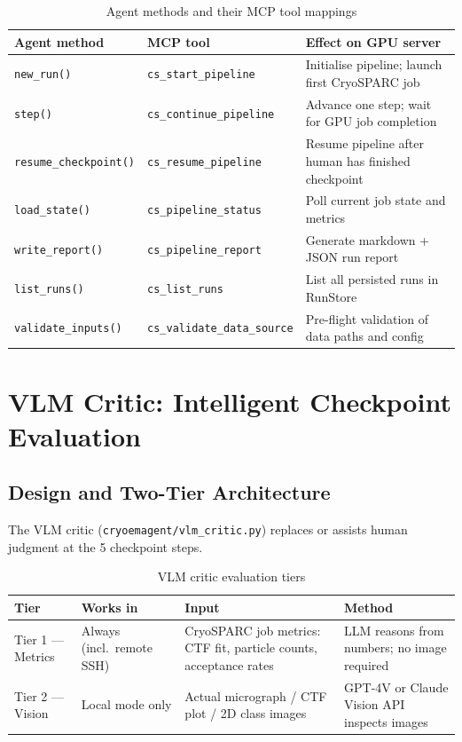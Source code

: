 \documentclass[12pt, a4paper]{article}
\begin{document}
\begin{table}[H]
\centering
\caption{Agent methods and their MCP tool mappings}
\label{tab:actions}
\renewcommand{\arraystretch}{1.3}
\begin{tabular}{l l p{6.2cm}}
\toprule
\textbf{Agent method} & \textbf{MCP tool} & \textbf{Effect on GPU server} \\
\midrule
\texttt{new\_run()}           & \texttt{cs\_start\_pipeline}
  & Initialise pipeline; launch first CryoSPARC job \\
\texttt{step()}               & \texttt{cs\_continue\_pipeline}
  & Advance one step; wait for GPU job completion \\
\texttt{resume\_checkpoint()} & \texttt{cs\_resume\_pipeline}
  & Resume pipeline after human has finished checkpoint \\
\texttt{load\_state()}        & \texttt{cs\_pipeline\_status}
  & Poll current job state and metrics \\
\texttt{write\_report()}      & \texttt{cs\_pipeline\_report}
  & Generate markdown + JSON run report \\
\texttt{list\_runs()}         & \texttt{cs\_list\_runs}
  & List all persisted runs in RunStore \\
\texttt{validate\_inputs()}   & \texttt{cs\_validate\_data\_source}
  & Pre-flight validation of data paths and config \\
\bottomrule
\end{tabular}
\end{table}

\section{VLM Critic: Intelligent Checkpoint Evaluation}
\label{sec:vlm}

\subsection{Design and Two-Tier Architecture}

The VLM critic (\texttt{cryoemagent/vlm\_critic.py}) replaces or assists
human judgment at the 5 checkpoint steps.

\begin{table}[H]
\centering
\caption{VLM critic evaluation tiers}
\label{tab:vlm-tiers}
\renewcommand{\arraystretch}{1.3}
\begin{tabular}{l l l p{5.8cm}}
\toprule
\textbf{Tier} & \textbf{Works in} & \textbf{Input} & \textbf{Method} \\
\midrule
Tier 1 --- Metrics
  & Always (incl.\ remote SSH)
  & CryoSPARC job metrics: CTF fit, particle counts, acceptance rates
  & LLM reasons from numbers; no image required \\
\addlinespace
Tier 2 --- Vision
  & Local mode only
  & Actual micrograph / CTF plot / 2D class images
  & GPT-4V or Claude Vision API inspects images \\
\bottomrule
\end{tabular}
\end{table}
\end{document}
